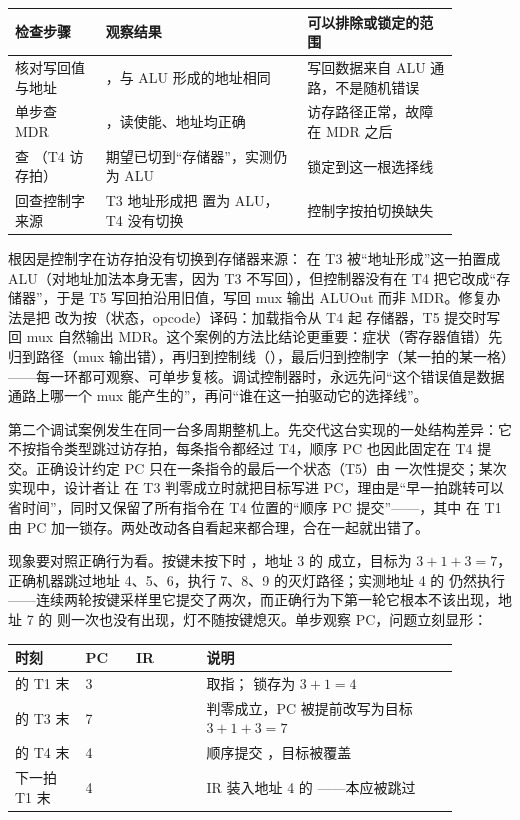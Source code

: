 \begin{longtable}{L{0.18\linewidth}L{0.4\linewidth}L{0.3\linewidth}}
\toprule
检查步骤 & 观察结果 & 可以排除或锁定的范围 \\
\midrule
核对写回值与地址 & ，与 ALU 形成的地址相同 & 写回数据来自 ALU 通路，不是随机错误 \\
单步查 MDR & ，读使能、地址均正确 & 访存路径正常，故障在 MDR 之后 \\
查 （T4 访存拍） & 期望已切到“存储器”，实测仍为 ALU & 锁定到这一根选择线 \\
回查控制字来源 & T3 地址形成把  置为 ALU，T4 没有切换 & 控制字按拍切换缺失 \\
\bottomrule
\end{longtable}

根因是控制字在访存拍没有切换到存储器来源： 在 T3 被“地址形成”这一拍置成 ALU（对地址加法本身无害，因为 T3 不写回），但控制器没有在 T4 把它改成“存储器”，于是 T5 写回拍沿用旧值，写回 mux 输出 ALUOut 而非 MDR。修复办法是把  改为按（状态，opcode）译码：加载指令从 T4 起  存储器，T5 提交时写回 mux 自然输出 MDR。这个案例的方法比结论更重要：症状（寄存器值错）先归到路径（mux 输出错），再归到控制线（），最后归到控制字（某一拍的某一格）——每一环都可观察、可单步复核。调试控制器时，永远先问“这个错误值是数据通路上哪一个 mux 能产生的”，再问“谁在这一拍驱动它的选择线”。

第二个调试案例发生在同一台多周期整机上。先交代这台实现的一处结构差异：它不按指令类型跳过访存拍，每条指令都经过 T4，顺序 PC 也因此固定在 T4 提交。正确设计约定 PC 只在一条指令的最后一个状态（T5）由  一次性提交；某次实现中，设计者让  在 T3 判零成立时就把目标写进 PC，理由是“早一拍跳转可以省时间”，同时又保留了所有指令在 T4 位置的“顺序 PC 提交”——，其中  在 T1 由 PC 加一锁存。两处改动各自看起来都合理，合在一起就出错了。

现象要对照正确行为看。按键未按下时 ，地址 3 的  成立，目标为 $3+1+3=7$，正确机器跳过地址 4、5、6，执行 7、8、9 的灭灯路径；实测地址 4 的  仍然执行——连续两轮按键采样里它提交了两次，而正确行为下第一轮它根本不该出现，地址 7 的  则一次也没有出现，灯不随按键熄灭。单步观察 PC，问题立刻显形：

\begin{longtable}{L{0.14\linewidth}L{0.1\linewidth}L{0.14\linewidth}L{0.5\linewidth}}
\toprule
时刻 & PC & IR & 说明 \\
\midrule
{} 的 T1 末 & 3 &  & 取指； 锁存为 $3+1=4$ \\
 的 T3 末 & 7 &  & 判零成立，PC 被提前改写为目标 $3+1+3=7$ \\
 的 T4 末 & 4 &  & 顺序提交 ，目标被覆盖 \\
下一拍 T1 末 & 4 &  & IR 装入地址 4 的 ——本应被跳过 \\
\bottomrule
\end{longtable}

